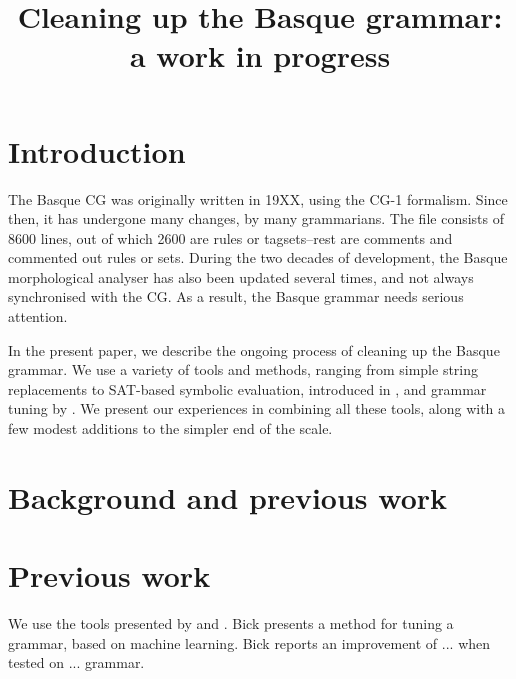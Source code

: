 \documentclass[11pt]{article}
\title{Cleaning up the Basque grammar: a work in progress}
\date{}
\begin{document}
\maketitle



\section{Introduction}

The Basque CG was originally written in 19XX, using the CG-1 formalism. Since then, it has undergone many changes, by many grammarians. The file consists of 8600 lines, out of which 2600 are rules or tagsets--rest are comments and commented out rules or sets. During the two decades of development, the Basque morphological analyser has also been updated several times, and not always synchronised with the CG. As a result, the Basque grammar needs serious attention.

In the present paper, we describe the ongoing process of cleaning up the Basque grammar. We use a variety of tools and methods, ranging from simple string replacements to SAT-based symbolic evaluation, introduced in \cite{listenmaa_claessen2016}, and grammar tuning by \cite{bick2013tuning}. We present our experiences in combining all these tools, along with a few modest additions to the simpler end of the scale.
\section{Background and previous work}


\section{Previous work}
We use the tools presented by \cite{bick2013tuning} and \cite{listenmaa_claessen2016}.
Bick \cite{bick2013tuning} presents a method for tuning a grammar, based on machine learning. Bick reports an improvement of ... when tested on ... grammar.
\end{document}
